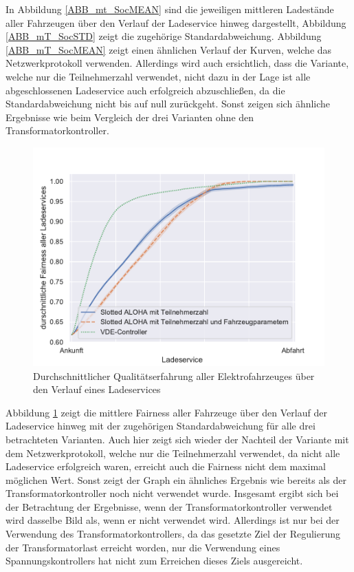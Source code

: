 In Abbildung \ref{ABB_mt_SocMEAN} sind die jeweiligen mittleren Ladestände aller Fahrzeugen über den Verlauf der Ladeservice hinweg dargestellt, Abbildung \ref{ABB_mT_SocSTD} zeigt die zugehörige Standardabweichung. Abbildung \ref{ABB_mT_SocMEAN} zeigt einen ähnlichen Verlauf der Kurven, welche das Netzwerkprotokoll verwenden. Allerdings wird auch ersichtlich, dass die Variante, welche nur die Teilnehmerzahl verwendet, nicht dazu in der Lage ist alle abgeschlossenen Ladeservice auch erfolgreich abzuschließen, da die Standardabweichung nicht bis auf null zurückgeht. Sonst zeigen sich ähnliche Ergebnisse wie beim Vergleich der drei Varianten ohne den Transformatorkontroller.
\begin{figure}[htb]
\centering
	\includegraphics[scale=0.6]{img/mitTrafo/SlottedAloha_participants_VDE_tau_trafo_15_qoe.pdf}
	\caption{Durchschnittlicher Qualitätserfahrung aller Elektrofahrzeuges über den Verlauf eines Ladeservices}
	\label{Abb_mT_Fairness}
\end{figure}
Abbildung \ref{Abb_mT_Fairness} zeigt die mittlere Fairness aller Fahrzeuge über den Verlauf der Ladeservice hinweg mit der zugehörigen Standardabweichung für alle drei betrachteten Varianten. Auch hier zeigt sich wieder der Nachteil der Variante mit dem Netzwerkprotokoll, welche nur die Teilnehmerzahl verwendet, da nicht alle Ladeservice erfolgreich waren, erreicht auch die Fairness nicht dem maximal möglichen Wert. Sonst zeigt der Graph ein ähnliches Ergebnis wie bereits als der Transformatorkontroller noch nicht verwendet wurde.
Insgesamt ergibt sich bei der Betrachtung der Ergebnisse, wenn der Transformatorkontroller verwendet wird dasselbe Bild als, wenn er nicht verwendet wird. Allerdings ist nur bei der Verwendung des Transformatorkontrollers, da das gesetzte Ziel der Regulierung der Transformatorlast erreicht worden, nur die Verwendung eines Spannungskontrollers hat nicht zum Erreichen dieses Ziels ausgereicht.
